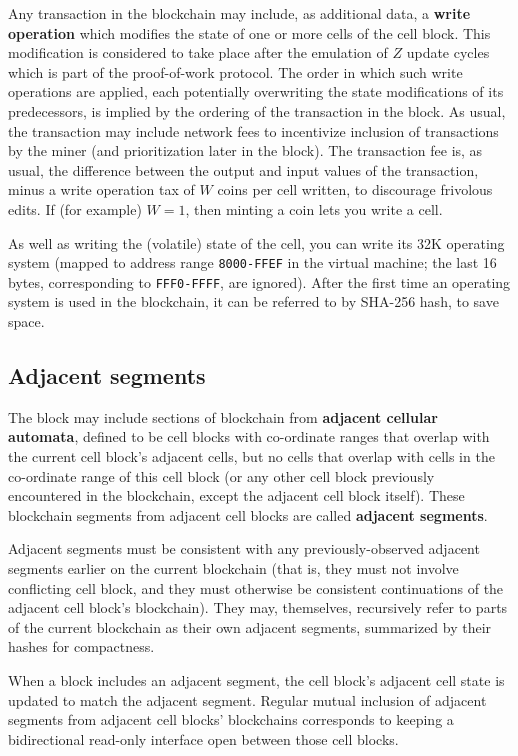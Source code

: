 \documentclass{article}
\newcommand\hex[1]{{\tt #1}}
\newcommand\hexrange[2]{\hex{#1}{\tt -}\hex{#2}}
\begin{document}
Any transaction in the blockchain may include, as additional data,
a {\bf write operation} which modifies the state of one or more cells of the cell block.
This modification is considered to take place after the emulation of $Z$ update cycles
which is part of the proof-of-work protocol.
The order in which such write operations are applied,
each potentially overwriting the state modifications of its predecessors,
is implied by the ordering of the transaction in the block.
As usual, the transaction may include network fees to incentivize inclusion of transactions
by the miner
(and prioritization later in the block).
The transaction fee is, as usual, the difference between the output and input values of the transaction,
minus a write operation tax of $W$ coins per cell written,
to discourage frivolous edits.
If (for example) $W=1$, then minting a coin lets you write a cell.

As well as writing the (volatile) state of the cell, you can write its 32K operating system
(mapped to address range \hexrange{8000}{FFEF} in the virtual machine; the last 16 bytes, corresponding to \hexrange{FFF0}{FFFF}, are ignored).
After the first time an operating system is used in the blockchain, it can be referred to by SHA-256 hash, to save space.

\subsection{Adjacent segments}

The block may include sections of blockchain from {\bf adjacent cellular automata},
defined to be cell blocks with co-ordinate ranges that
overlap with the current cell block's adjacent cells,
but no cells that overlap with
cells in the co-ordinate range of this cell block (or any other cell block previously encountered in the blockchain,
except the adjacent cell block itself).
These blockchain segments from adjacent cell blocks are called {\bf adjacent segments}.

Adjacent segments must be consistent with any previously-observed adjacent segments
earlier on the current blockchain (that is, they must not involve conflicting cell block,
and they must otherwise be consistent continuations of the adjacent cell block's blockchain).
They may, themselves, recursively refer to parts of the current blockchain as their own adjacent segments,
summarized by their hashes for compactness.

When a block includes an adjacent segment, the cell block's adjacent cell state is updated to match the adjacent segment.
Regular mutual inclusion of adjacent segments from adjacent cell blocks' blockchains
corresponds to keeping a bidirectional read-only interface open between those cell blocks.
\end{document}
